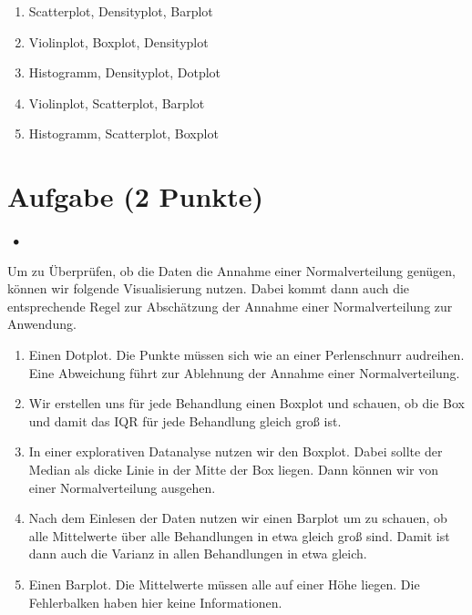 \documentclass[a4paper, 9pt]{scrartcl}\usepackage[]{graphicx}\usepackage[]{xcolor}
\begin{document}
\begin{enumerate}
\item [\textbf{A} \msquare] Scatterplot, Densityplot, Barplot
\item [\textbf{B} \msquare] Violinplot, Boxplot, Densityplot
\item [\textbf{C} \msquare] Histogramm, Densityplot, Dotplot
\item [\textbf{D} \msquare] Violinplot, Scatterplot, Barplot
\item [\textbf{E} \msquare] Histogramm, Scatterplot, Boxplot
\end{enumerate}

\section{Aufgabe \hfill (2 Punkte)}


\ifcollection
\begin{flushright}
\tiny\vspace{-2Ex}
\textbf{\examinhaltstart}
\exammodulestatversuch $\;\bullet$
\exammodulebiostat
\vspace{-1Ex}
\end{flushright}
\fi




Um zu Überprüfen, ob die Daten die Annahme einer Normalverteilung genügen, können wir folgende Visualisierung nutzen. Dabei kommt dann auch die entsprechende Regel zur Abschätzung der Annahme einer Normalverteilung zur Anwendung.



\begin{enumerate}
\item [\textbf{A} \msquare] Einen Dotplot. Die Punkte müssen sich wie an einer Perlenschnurr audreihen. Eine Abweichung führt zur Ablehnung der Annahme einer Normalverteilung.
\item [\textbf{B} \msquare] Wir erstellen uns für jede Behandlung einen Boxplot und schauen, ob die Box und damit das IQR für jede Behandlung gleich groß ist.
\item [\textbf{C} \msquare] In einer explorativen Datanalyse nutzen wir den Boxplot. Dabei sollte der Median als dicke Linie in der Mitte der Box liegen. Dann können wir von einer Normalverteilung ausgehen.
\item [\textbf{D} \msquare] Nach dem Einlesen der Daten nutzen wir einen Barplot um zu schauen, ob alle Mittelwerte über alle Behandlungen in etwa gleich groß sind. Damit ist dann auch die Varianz in allen Behandlungen in etwa gleich.
\item [\textbf{E} \msquare] Einen Barplot. Die Mittelwerte müssen alle auf einer Höhe liegen. Die Fehlerbalken haben hier keine Informationen.
\end{enumerate}
\end{document}
